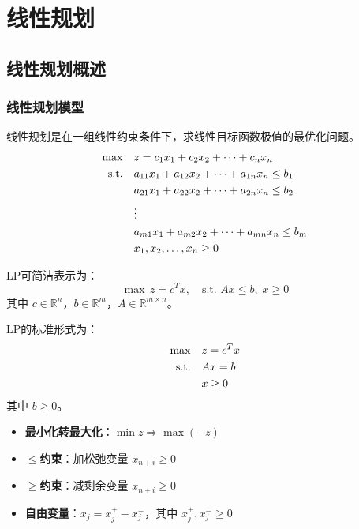 \chapter{线性规划}\label{chap:lp}
\section{线性规划概述}\label{sec:ch2-intro}

\subsection{线性规划模型}

\begin{definition}[线性规划（LP）]
线性规划是在一组线性约束条件下，求线性目标函数极值的最优化问题。
\begin{align}
\max \quad & z = c_1 x_1 + c_2 x_2 + \cdots + c_n x_n \notag \\
\text{s.t.} \quad & a_{11}x_1 + a_{12}x_2 + \cdots + a_{1n}x_n \leq b_1 \notag \\
& a_{21}x_1 + a_{22}x_2 + \cdots + a_{2n}x_n \leq b_2 \notag \\
& \vdots \label{eq:lp-general} \\
& a_{m1}x_1 + a_{m2}x_2 + \cdots + a_{mn}x_n \leq b_m \notag \\
& x_1, x_2, \ldots, x_n \geq 0 \notag
\end{align}
\end{definition}

\begin{conceptbox}[矩阵形式]
LP可简洁表示为：
\[
\max \, z = c^T x, \quad \text{s.t. } Ax \leq b, \; x \geq 0
\]
其中 $c \in \mathbb{R}^n$，$b \in \mathbb{R}^m$，$A \in \mathbb{R}^{m \times n}$。
\end{conceptbox}

\begin{definition}[LP标准型]
LP的标准形式为：
\begin{align}
\max \quad & z = c^T x \label{eq:lp-standard} \\
\text{s.t.} \quad & Ax = b \notag \\
& x \geq 0 \notag
\end{align}
其中 $b \geq 0$。
\end{definition}

\begin{notebox}[转化为标准型]
\begin{itemize}
    \item \textbf{最小化转最大化}：$\min z \Rightarrow \max (-z)$
    \item \textbf{$\leq$约束}：加松弛变量 $x_{n+i} \geq 0$
    \item \textbf{$\geq$约束}：减剩余变量 $x_{n+i} \geq 0$
    \item \textbf{自由变量}：$x_j = x_j^+ - x_j^-$，其中 $x_j^+, x_j^- \geq 0$
\end{itemize}
\end{notebox}

